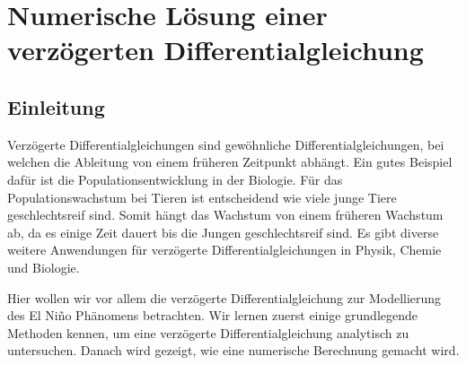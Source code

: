 %
%
%
\chapter{Numerische Lösung einer verzögerten Differentialgleichung\label{chapter:verzoegert}}
\begin{refsection}

\section{Einleitung}
Verzögerte Differentialgleichungen sind gewöhnliche Differentialgleichungen, bei welchen die Ableitung von einem früheren Zeitpunkt abhängt.
Ein gutes Beispiel dafür ist die Populationsentwicklung in der Biologie. 
Für das Populationswachstum bei Tieren ist entscheidend wie viele junge Tiere geschlechtsreif sind.
Somit hängt das Wachstum von einem früheren Wachstum ab, da es einige Zeit dauert bis die Jungen geschlechtsreif sind.
Es gibt diverse weitere Anwendungen für verzögerte Differentialgleichungen in Physik, Chemie und Biologie. %

Hier wollen wir vor allem die verzögerte Differentialgleichung zur Modellierung des El Niño Phänomens  betrachten. %
Wir lernen zuerst einige grundlegende Methoden kennen, um eine verzögerte Differentialgleichung analytisch zu untersuchen. 
Danach wird gezeigt, wie eine numerische Berechnung gemacht wird.






\printbibliography[heading=subbibliography]
\end{refsection}
